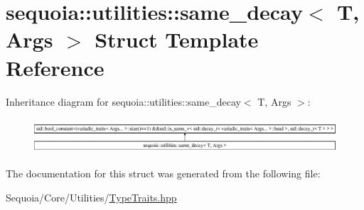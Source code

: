 \hypertarget{structsequoia_1_1utilities_1_1same__decay}{}\section{sequoia\+::utilities\+::same\+\_\+decay$<$ T, Args $>$ Struct Template Reference}
\label{structsequoia_1_1utilities_1_1same__decay}
Inheritance diagram for sequoia\+::utilities\+::same\+\_\+decay$<$ T, Args $>$\+:\begin{figure}[H]
\begin{center}
\leavevmode
\includegraphics[height=1.317647cm]{structsequoia_1_1utilities_1_1same__decay}
\end{center}
\end{figure}


The documentation for this struct was generated from the following file\+:\begin{DoxyCompactItemize}
\item 
Sequoia/\+Core/\+Utilities/\mbox{\hyperlink{_type_traits_8hpp}{Type\+Traits.\+hpp}}\end{DoxyCompactItemize}
